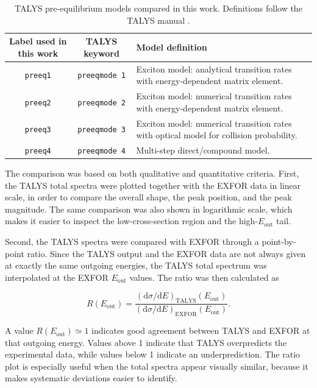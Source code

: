 \begin{table}[H]
\centering
\caption{TALYS pre-equilibrium models compared in this work. Definitions follow the TALYS manual \cite{koning2025talys}.}
\label{tab:preeq-configurations}
\begin{tabular}{c c p{}}
\hline
\textbf{Label used in this work} & \textbf{TALYS keyword} & \textbf{Model definition} \\
\hline
\texttt{preeq1} & \texttt{preeqmode 1} & Exciton model: analytical transition rates with energy-dependent matrix element. \\

\texttt{preeq2} & \texttt{preeqmode 2} & Exciton model: numerical transition rates with energy-dependent matrix element. \\

\texttt{preeq3} & \texttt{preeqmode 3} & Exciton model: numerical transition rates with optical model for collision probability. \\

\texttt{preeq4} & \texttt{preeqmode 4} & Multi-step direct/compound model. \\
\hline
\end{tabular}
\end{table}


The comparison was based on both qualitative and quantitative criteria. First, the TALYS total spectra were plotted together with the EXFOR data in linear scale, in order to compare the overall shape, the peak position, and the peak magnitude. The same comparison was also shown in logarithmic scale, which makes it easier to inspect the low-cross-section region and the high-\(E_{\mathrm{out}}\) tail.

Second, the TALYS spectra were compared with EXFOR through a point-by-point ratio. Since the TALYS output and the EXFOR data are not always given at exactly the same outgoing energies, the TALYS total spectrum was interpolated at the EXFOR \(E_{\mathrm{out}}\) values. The ratio was then calculated as

%
\begin{equation}
R(E_{\mathrm{out}}) =
\frac{
\left(\mathrm{d}\sigma/\mathrm{d}E\right)_{\mathrm{TALYS}}(E_{\mathrm{out}})
}{
\left(\mathrm{d}\sigma/\mathrm{d}E\right)_{\mathrm{EXFOR}}(E_{\mathrm{out}})
}.
\label{eq:ratio}
\end{equation}
%

A value \(R(E_{\mathrm{out}}) \simeq 1\) indicates good agreement between TALYS and EXFOR at that outgoing energy. Values above 1 indicate that TALYS overpredicts the experimental data, while values below 1 indicate an underprediction. The ratio plot is especially useful when the total spectra appear visually similar, because it makes systematic deviations easier to identify.

